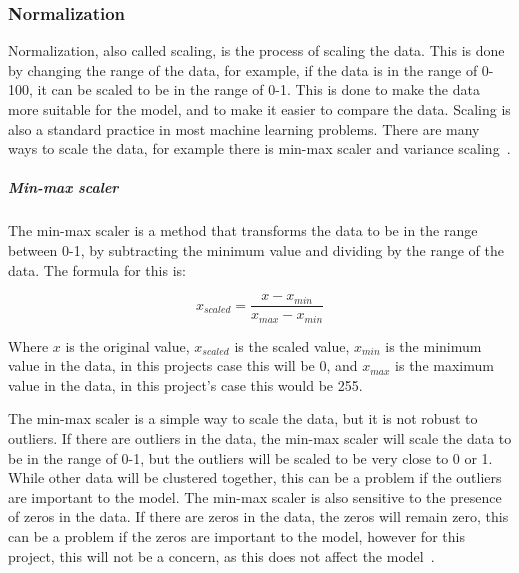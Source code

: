 \subsubsection{Normalization}\label{sec:normalization}
Normalization, also called scaling, is the process of scaling the data. This is done by changing the range of the data, for example, if the data is in the range of 0-100, it can be scaled to be in the range of 0-1. This is done to make the data more suitable for the model, and to make it easier to compare the data. Scaling is also a standard practice in most machine learning problems. There are many ways to scale the data, for example there is min-max scaler and variance scaling~\cite{Feature-engineering-zheng}.

  
\subparagraph{Min-max scaler}\label{subsec:min-max}
The min-max scaler is a method that transforms the data to be in the range between 0-1, by subtracting the minimum value and dividing by the range of the data. The formula for this is:

\begin{equation}
    x_{scaled} = \frac{x - x_{min}}{x_{max} - x_{min}}
\end{equation}

Where $x$ is the original value, $x_{scaled}$ is the scaled value, $x_{min}$ is the minimum value in the data, in this projects case this will be 0, and $x_{max}$ is the maximum value in the data, in this project's case this would be 255.


The min-max scaler is a simple way to scale the data, but it is not robust to outliers. If there are outliers in the data, the min-max scaler will scale the data to be in the range of 0-1, but the outliers will be scaled to be very close to 0 or 1. While other data will be clustered together, this can be a problem if the outliers are important to the model. The min-max scaler is also sensitive to the presence of zeros in the data. If there are zeros in the data, the zeros will remain zero, this can be a problem if the zeros are important to the model, however for this project, this will not be a concern, as this does not affect the model~\cite{Feature-engineering-zheng}.



